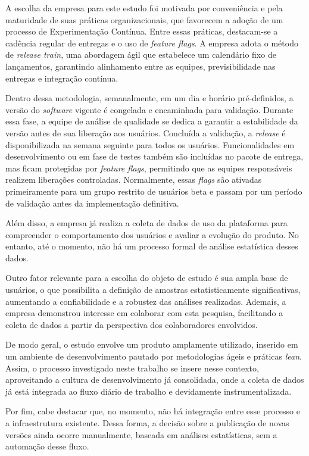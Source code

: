 A escolha da empresa para este estudo foi motivada por conveniência e pela maturidade de suas práticas organizacionais, que favorecem a adoção de um processo de Experimentação Contínua. Entre essas práticas, destacam-se a cadência regular de entregas e o uso de \textit{feature flags}. A empresa adota o método de \textit{release train}, uma abordagem ágil que estabelece um calendário fixo de lançamentos, garantindo alinhamento entre as equipes, previsibilidade nas entregas e integração contínua.

Dentro dessa metodologia, semanalmente, em um dia e horário pré-definidos, a versão do \textit{software} vigente é congelada e encaminhada para validação. Durante essa fase, a equipe de análise de qualidade se dedica a garantir a estabilidade da versão antes de sua liberação aos usuários. Concluída a validação, a \textit{release} é disponibilizada na semana seguinte para todos os usuários. Funcionalidades em desenvolvimento ou em fase de testes também são incluídas no pacote de entrega, mas ficam protegidas por \textit{feature flags}, permitindo que as equipes responsáveis realizem liberações controladas. Normalmente, essas \textit{flags} são ativadas primeiramente para um grupo restrito de usuários beta e passam por um período de validação antes da implementação definitiva.

Além disso, a empresa já realiza a coleta de dados de uso da plataforma para compreender o comportamento dos usuários e avaliar a evolução do produto. No entanto, até o momento, não há um processo formal de análise estatística desses dados.

Outro fator relevante para a escolha do objeto de estudo é sua ampla base de usuários, o que possibilita a definição de amostras estatisticamente significativas, aumentando a confiabilidade e a robustez das análises realizadas. Ademais, a empresa demonstrou interesse em colaborar com esta pesquisa, facilitando a coleta de dados a partir da perspectiva dos colaboradores envolvidos.

De modo geral, o estudo envolve um produto amplamente utilizado, inserido em um ambiente de desenvolvimento pautado por metodologias ágeis e práticas \textit{lean}. Assim, o processo investigado neste trabalho se insere nesse contexto, aproveitando a cultura de desenvolvimento já consolidada, onde a coleta de dados já está integrada ao fluxo diário de trabalho e devidamente instrumentalizada.

Por fim, cabe destacar que, no momento, não há integração entre esse processo e a infraestrutura existente. Dessa forma, a decisão sobre a publicação de novas versões ainda ocorre manualmente, baseada em análises estatísticas, sem a automação desse fluxo.


